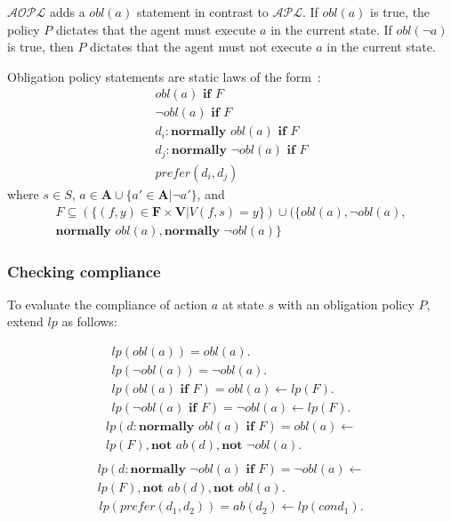 $\mathcal{AOPL}$ adds a $obl(a)$ statement in contrast to $\mathcal{APL}$.
If $obl(a)$ is true, the policy $P$ dictates that the agent must execute $a$ in the current state.
If $obl(\neg a)$ is true, then $P$ dictates that the agent must not execute $a$ in the current state.

\begin{definition}
    Obligation policy statements are static laws of the form~\citep{gelfond_authorization_2008}:
    \begin{gather}
        obl\left(a\right) \textbf{ if } F \\
        \neg obl\left(a\right) \textbf{ if } F \\
        d_i: \textbf{normally } obl(a) \textbf{ if } F \\
        d_j: \textbf{normally } \neg obl(a) \textbf{ if } F \\
        prefer(d_i, d_j)
    \end{gather}
    where $s \in S$, $a \in \boldsymbol{A} \cup \{a' \in \boldsymbol{A} | \neg a'\}$, and
    \begin{multline}
        F\subseteq\left(\{(f, y) \in \boldsymbol{F} \times \boldsymbol{V} | V(f,s)=y\}\right) \cup (\{obl(a),
            \neg obl(a), \\
            \textbf{normally } obl(a),
            \textbf{normally } \neg obl(a)\}
    \end{multline}
\end{definition}

\subsubsection{Checking compliance}

To evaluate the compliance of action $a$ at state $s$ with an obligation policy $P$, \citet{gelfond_authorization_2008} extend $lp$ as follows:

\begin{gather}
    lp(obl(a)) =
        obl(a). \\
    lp(\neg obl(a)) =
        \neg obl(a). \\
    lp(obl(a) \textbf{ if } F) =
        obl(a) \leftarrow
            lp(F). \\
    lp(\neg obl(a) \textbf{ if } F) =
        \neg obl(a) \leftarrow
            lp(F).
\end{gather}
\begin{multline}
    lp(d: \textbf{normally } obl(a) \textbf{ if } F) =
        obl(a) \leftarrow \\
            lp(F),
            \textbf{not } ab(d),
            \textbf{not } \neg obl(a). \\
\end{multline}
\begin{multline}
    lp(d: \textbf{normally } \neg obl(a) \textbf{ if } F) =
        \neg obl(a) \leftarrow \\
            lp(F),
            \textbf{not } ab(d),
            \textbf{not } obl(a).
\end{multline}
\begin{gather}
    lp(prefer(d_1, d_2)) =
        ab(d_2) \leftarrow lp(cond_1).
\end{gather}

